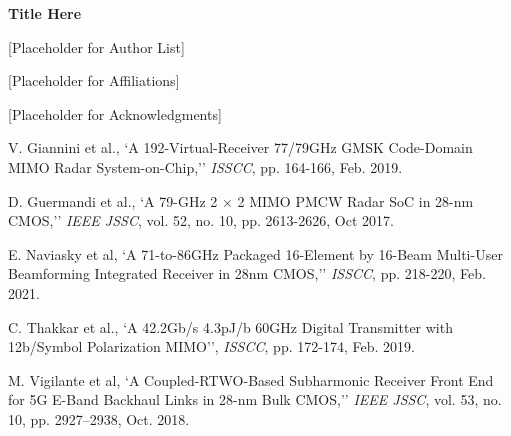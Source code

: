 \documentclass[8pt]{article}
\begin{document}
\begin{multicols}{2}

{\fontsize{10}{12}\selectfont\textbf{Title Here}}

[Placeholder for Author List]

[Placeholder for Affiliations]

\lipsum[1-13]

[Placeholder for Acknowledgments]

\begin{thebibliography}{99}
\setlength{\itemsep}{0pt}

V. Giannini et al., `A 192-Virtual-Receiver 77/79GHz GMSK Code-Domain MIMO Radar System-on-Chip,'' 
\textit{ISSCC}, pp. 164-166, Feb. 2019.

\vspace{-0.4\baselineskip} 

D. Guermandi et al., 
`A 79-GHz 2 × 2 MIMO PMCW Radar SoC in 28-nm CMOS,'' 
\textit{IEEE JSSC}, vol. 52, no. 10,
pp. 2613-2626, Oct 2017.

\vspace{-0.4\baselineskip} 

E. Naviasky et al, 
`A 71-to-86GHz Packaged 16-Element by 16-Beam Multi-User Beamforming Integrated Receiver in 28nm CMOS,''
\textit{ISSCC}, pp. 218-220, Feb. 2021.

\vspace{-0.4\baselineskip} 

C. Thakkar et al., 
`A 42.2Gb/s 4.3pJ/b 60GHz Digital Transmitter with 12b/Symbol Polarization MIMO'', 
\textit{ISSCC}, pp. 172-174, Feb. 2019.

\vspace{-0.4\baselineskip}

M. Vigilante et al, 
`A Coupled-RTWO-Based Subharmonic Receiver Front End for 5G E-Band Backhaul Links in 28-nm Bulk CMOS,'' 
\textit{IEEE JSSC}, vol. 53, no. 10, 
pp. 2927–2938, Oct. 2018.

\vspace{-0.4\baselineskip} 

\end{thebibliography}

\end{multicols}

\end{document}
